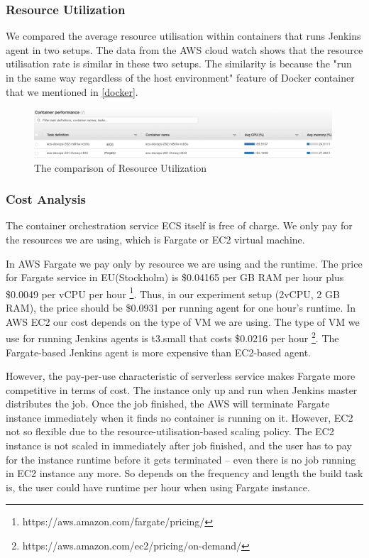 \subsubsection{Resource Utilization}
We compared the average resource utilisation within containers that runs Jenkins agent in two setups. The data from the AWS cloud watch shows that the resource utilisation rate is similar in these two setups. The similarity is because the "run in the same way regardless of the host environment" \cite{WhatisaC60:online} feature of Docker container that we mentioned in \ref{docker}.
\begin{figure}[h]
\centering
\includegraphics[width=0.99\textwidth]{pics/utilizationecs.png}
\caption{The comparison of Resource Utilization}
\label{fig:utilizationecs}
\end{figure}
\subsubsection{Cost Analysis}
The container orchestration service ECS itself is free of charge. We only pay for the resources we are using, which is Fargate or EC2 virtual machine.
\par
In AWS Fargate we pay only by resource we are using and the runtime. The price for Fargate service in EU(Stockholm) is \$0.04165 per GB RAM per hour plus \$0.0049 per vCPU per hour \footnote{https://aws.amazon.com/fargate/pricing/}. Thus, in our experiment setup (2vCPU, 2 GB RAM), the price should be \$0.0931 per running agent for one hour's runtime.
In AWS EC2 our cost depends on the type of VM we are using. The type of VM we use for running Jenkins agents is t3.small that costs \$0.0216 per hour \footnote{https://aws.amazon.com/ec2/pricing/on-demand/}. The Fargate-based Jenkins agent is more expensive than EC2-based agent.
\par
However, the pay-per-use characteristic of serverless service makes Fargate more competitive in terms of cost. The instance only up and run when Jenkins master distributes the job. Once the job finished, the AWS will terminate Fargate instance immediately when it finds no container is running on it. However, EC2 not so flexible due to the resource-utilisation-based scaling policy. The EC2 instance is not scaled in immediately after job finished, and the user has to pay for the instance runtime before it gets terminated -- even there is no job running in EC2 instance any more. So depends on the frequency and length the build task is, the user could have runtime per hour when using Fargate instance.
